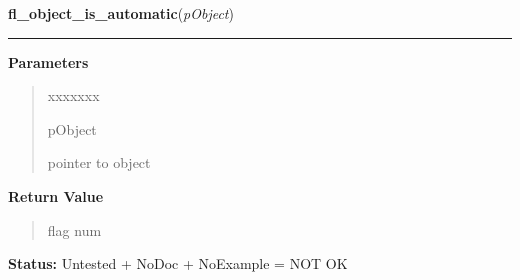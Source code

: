\hspace{.8\funcindent}\begin{boxedminipage}{\funcwidth}

    \raggedright \textbf{fl\_object\_is\_automatic}(\textit{pObject})

    \vspace{-1.5ex}

    \rule{\textwidth}{0.5\fboxrule}
\setlength{\parskip}{2ex}
\setlength{\parskip}{1ex}
      \textbf{Parameters}
      \vspace{-1ex}

      \begin{quote}
        \begin{Ventry}{xxxxxxx}

          \item[pObject]

          pointer to object

        \end{Ventry}

      \end{quote}

      \textbf{Return Value}
    \vspace{-1ex}

      \begin{quote}
      flag num

      \end{quote}

\textbf{Status:} Untested + NoDoc + NoExample = NOT OK



    \end{boxedminipage}

    \label{xformslib:library:fl_draw_object_label}

    \vspace{0.5ex}

